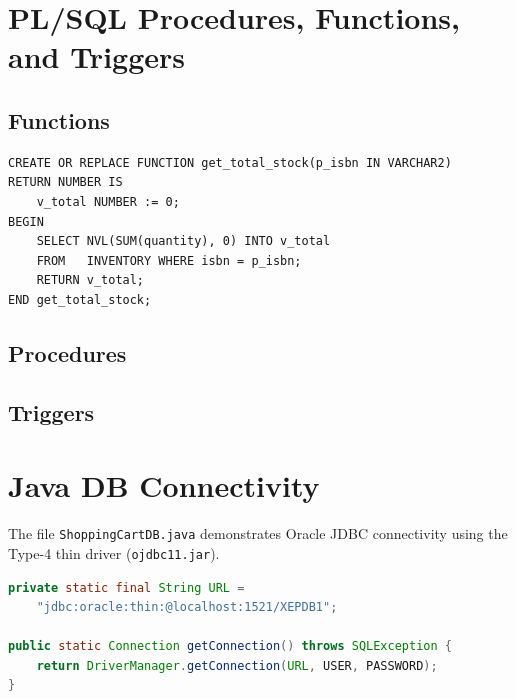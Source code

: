 \documentclass[12pt, a4paper]{article}
\begin{document}






\section{PL/SQL Procedures, Functions, and Triggers}

\subsection{Functions}

\begin{lstlisting}[caption={get\_total\_stock: total stock across all warehouses}]
CREATE OR REPLACE FUNCTION get_total_stock(p_isbn IN VARCHAR2)
RETURN NUMBER IS
    v_total NUMBER := 0;
BEGIN
    SELECT NVL(SUM(quantity), 0) INTO v_total
    FROM   INVENTORY WHERE isbn = p_isbn;
    RETURN v_total;
END get_total_stock;
\end{lstlisting}

\subsection{Procedures}





\subsection{Triggers}






\section{Java DB Connectivity}


The file \texttt{ShoppingCartDB.java} demonstrates Oracle JDBC connectivity
using the Type-4 thin driver (\texttt{ojdbc11.jar}).

\begin{lstlisting}[language=Java, caption={JDBC connection setup}]
private static final String URL =
    "jdbc:oracle:thin:@localhost:1521/XEPDB1";

public static Connection getConnection() throws SQLException {
    return DriverManager.getConnection(URL, USER, PASSWORD);
}
\end{lstlisting}
\end{document}
